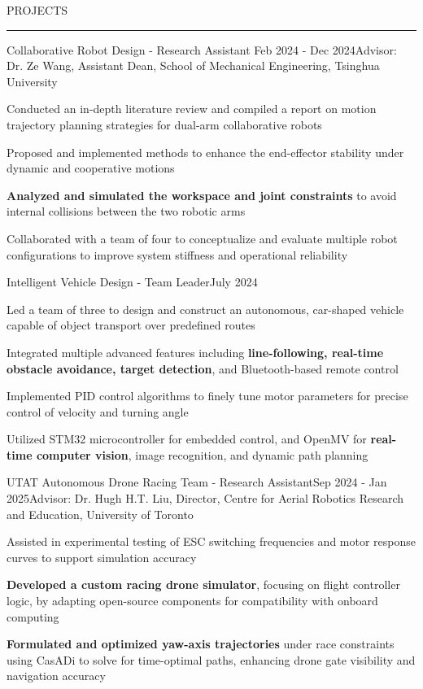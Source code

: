 \documentclass{resume} %
\renewenvironment{rSection}[1]{
\sectionskip
\textcolor{TsinghuaPurple}{\MakeUppercase{#1}}
\sectionlineskip
\hrule
\begin{list}{}{
\setlength{\leftmargin}{0em}
}
\item[]
}{
\end{list}
}
\begin{document}
\begin{rSection}{PROJECTS}

    \begin{rSubsection}{Collaborative Robot Design - Research Assistant} {Feb 2024 - Dec 2024}{Advisor: Dr. Ze Wang, Assistant Dean, School of Mechanical Engineering, Tsinghua University}{}
    \item Conducted an in-depth literature review and compiled a report on motion trajectory planning strategies for dual-arm collaborative robots
    \item Proposed and implemented methods to enhance the end-effector stability under dynamic and cooperative motions
    \item \textbf{Analyzed and simulated the workspace and joint constraints} to avoid internal collisions between the two robotic arms
    \item Collaborated with a team of four to conceptualize and evaluate multiple robot configurations to improve system stiffness and operational reliability
    \end{rSubsection}  
    
    \begin{rSubsection}{Intelligent Vehicle Design - Team Leader}{July 2024}{}{}
    \item Led a team of three to design and construct an autonomous, car-shaped vehicle capable of object transport over predefined routes
    \item Integrated multiple advanced features including \textbf{line-following, real-time obstacle avoidance, target detection}, and Bluetooth-based remote control
    \item Implemented PID control algorithms to finely tune motor parameters for precise control of velocity and turning angle
    \item Utilized STM32 microcontroller for embedded control, and OpenMV for \textbf{real-time computer vision}, image recognition, and dynamic path planning
    \end{rSubsection}
    
    \begin{rSubsection}{UTAT Autonomous Drone Racing Team - Research Assistant}{Sep 2024 - Jan 2025}{Advisor: Dr. Hugh H.T. Liu, Director, Centre for Aerial Robotics Research and Education, University of Toronto}{}    
    \item Assisted in experimental testing of ESC switching frequencies and motor response curves to support simulation accuracy
    \item \textbf{Developed a custom racing drone simulator}, focusing on flight controller logic, by adapting open-source components for compatibility with onboard computing
    \item \textbf{Formulated and optimized yaw-axis trajectories} under race constraints using CasADi to solve for time-optimal paths, enhancing drone gate visibility and navigation accuracy
    \end{rSubsection} 
    

\end{rSection}
\end{document}
